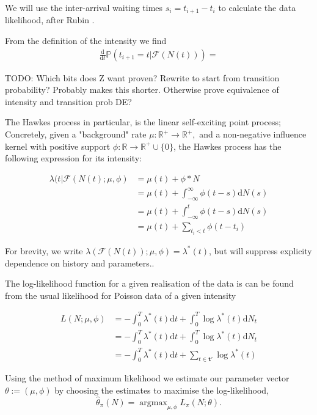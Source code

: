 \documentclass[11pt]{article}
\def\lt{<}
\newcommand{\dd}{\mathrm{d}}
\newcommand{\bb}[1]{\mathbb{#1}}
\renewcommand{\v}[1]{\boldsymbol{#1}}
\newcommand{\oo}[1]{\operatorname{#1}}
\begin{document}
    We will use the inter-arrival waiting times \(s_i=t_{i+1}-t_i\) to
calculate the data likelihood, after Rubin \cite{rubin_regular_1972}.

From the definition of the intensity we find \[\begin{aligned}
\frac{\dd}{\dd t}\bb P(t_{i+1}=t|\mathcal{F}(N(t)))=
\end{aligned}\]

TODO: Which bits does Z want proven? Rewrite to start from transition
probability? Probably makes this shorter. Otherwise prove equivalence of
intensity and transition prob DE?

    The Hawkes process \cite{hawkes_point_1971} in particular, is the linear
self-exciting point process; Concretely, given a "background" rate
\(\mu:\mathbb{R}^+\rightarrow\mathbb{R}^+,\) and a non-negative
influence kernel with positive support
\(\phi:\mathbb{R}\rightarrow\mathbb{R}^+\cup\{0\}\), the Hawkes process
has the following expression for its intensity:

\[
\begin{aligned}
\lambda(t|\mathcal{F}(N(t);\mu,\phi) &= \mu(t) + \phi * N\\
&= \mu(t)  + \int_{-\infty}^{\infty}\phi(t-s)\dd N(s)\\
&= \mu(t) + \int_{-\infty}^{t}\phi(t-s)\dd N(s)\\
&= \mu(t) + \sum_{t_i\lt t}\phi(t-t_i)
\end{aligned}
\]

For brevity, we write
\(\lambda(\mathcal{F}(N(t));\mu,\phi)=\lambda^*(t)\), but will suppress
explicity dependence on history and parameters..

    The log-likelihood function for a given realisation of the data is can
be found from the usual likelihood for Poisson data of a given intensity
\cite{ozaki_estimating_1979}

\[\begin{aligned}L(N;\mu,\phi) &=-\int_0^T\lambda^*(t) \dd t + \int_0^T\log \lambda^*(t) \dd N_t \\
&=-\int_0^T\lambda^*(t)\dd t + \int_0^T\log \lambda^*(t) \dd N_t \\
&=-\int_0^T\lambda^*(t)\dd t + \sum_{t\in\v{t}'}\log \lambda^*(t)
\end{aligned}\]

Using the method of maximum likelihood we estimate our parameter vector
\(\theta:=(\mu, \phi)\) by choosing the estimates to maximise the
log-likelihood,
\[\hat{\theta}_\pi(N) = \oo{argmax}_{\mu,\phi} L_\pi(N;\theta).\]
\end{document}
